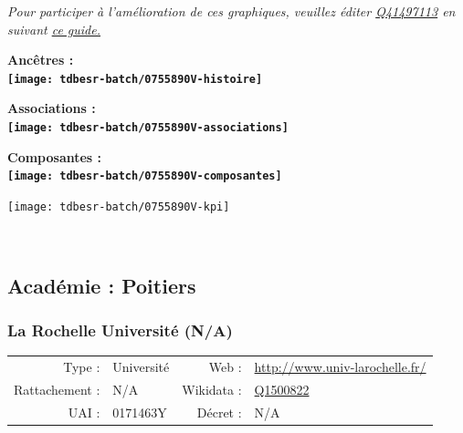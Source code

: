 \documentclass[12pt,french,]{article}
\begin{document}
\textit{\scriptsize Pour participer à l'amélioration de ces graphiques, veuillez éditer  \href{https://www.wikidata.org/entity/Q41497113}{Q41497113}  en suivant \href{https://github.com/cpesr/wikidataESR/blob/master/Rmd/wikidataESR.md}{ce guide.}}

\vspace{1cm}  
\begin{minipage}[b]{0.50\textwidth}\begin{center} \bf Ancêtres : \\  
\texttt{[image: tdbesr-batch/0755890V-histoire]} \end{center}\end{minipage}\begin{minipage}[b]{0.50\textwidth}\begin{center} \bf Associations : \\  
\texttt{[image: tdbesr-batch/0755890V-associations]} \end{center}\end{minipage}

\hrulefill

\begin{center} \bf Composantes : \\  
\texttt{[image: tdbesr-batch/0755890V-composantes]} \end{center}

\begin{center}\texttt{[image: tdbesr-batch/0755890V-kpi]} \end{center}\checkoddpage

\ifoddpage \fi ~\newpage  

\hypertarget{acaduxe9mie-poitiers}{%
\subsection{Académie : Poitiers}\label{acaduxe9mie-poitiers}}

\hypertarget{la-rochelle-universituxe9-na}{%
\subsubsection{La Rochelle Université
(N/A)}\label{la-rochelle-universituxe9-na}}

\begin{tabular*}{\textwidth}{rp{5cm}rl}  
\hline  
Type : & Université & Web : &\href{http://www.univ-larochelle.fr/}{http://www.univ-larochelle.fr/} \\  
Rattachement : & N/A & Wikidata : & \href{https://www.wikidata.org/entity/Q1500822}{Q1500822} \\  
UAI : & 0171463Y & Décret : & N/A \\  
\hline  
\end{tabular*}
\end{document}
